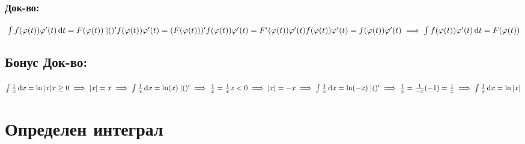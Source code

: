 \documentclass{article}
\newcommand{\dx}[1]{\,\mathrm{d}#1}
\begin{document}
    \subsubsection{Док-во:}
    \(\\\int f(\varphi(t))\varphi'(t)\dx{t} = F(\varphi(t)) \; |()'\\
    \\ f(\varphi(t))\varphi'(t) = (F(\varphi(t)))'\\
    \\ f(\varphi(t))\varphi'(t) = F'(\varphi(t))\varphi'(t)\\
    \\ f(\varphi(t))\varphi'(t) = f(\varphi(t))\varphi'(t)\\
    \\\implies \int f(\varphi(t))\varphi'(t)\dx{t} = F(\varphi(t))\)
    \subsection{Бонус Док-во:}
    \(\int \frac{1}{x} \dx{x} = \ln|x|\\
    \\x \geq 0 \implies |x| = x\\
    \\\implies \int \frac{1}{x} \dx{x} = \ln(x) \; |()'\\
    \\\implies \frac{1}{x} = \frac{1}{x}\\
    \\x < 0 \implies |x| = -x\\
    \\\implies \int \frac{1}{x} \dx{x} = \ln(-x) \; |()'\\
    \\\implies \frac{1}{x} = \frac{1}{-x}(-1) = \frac{1}{x}\\
    \\\implies \int \frac{1}{x} \dx{x} = \ln|x|\)
    \section{Определен интеграл}
\end{document}
